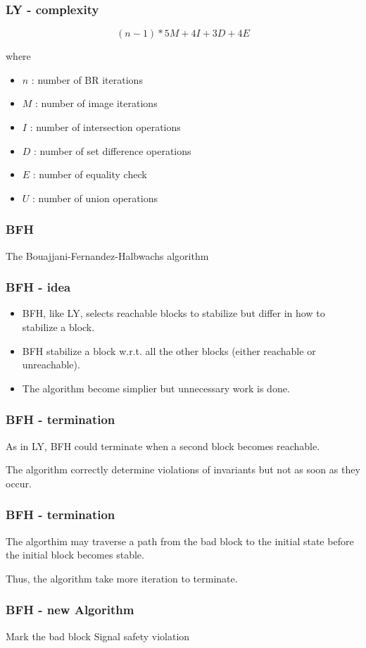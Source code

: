 \documentclass[11pt,handout]{beamer}
\begin{document}
\begin{frame}
  \frametitle{LY - complexity}
  \[
    (n-1) * 5M + 4I + 3D + 4E
  \]

  where

  \begin{itemize}
  \item $n$ : number of BR iterations
  \item $M$ : number of image iterations
  \item $I$ : number of intersection operations
  \item $D$ : number of set difference operations
  \item $E$ : number of equality check
  \item $U$ : number of union operations
  \end{itemize}
\end{frame}

\begin{frame}
  \frametitle{BFH}
  The Bouajjani-Fernandez-Halbwachs algorithm
\end{frame}

\begin{frame}
  \frametitle{BFH - idea}
  \begin{itemize}
  \item BFH, like LY, selects reachable blocks to stabilize but differ in how to
    stabilize a block.
  \item BFH stabilize a block w.r.t. all the other blocks (either reachable or
    unreachable).
  \item The algorithm become simplier but unnecessary work is done.
  \end{itemize} 
\end{frame}

\begin{frame}
  \frametitle{BFH - termination}
  As in LY, BFH could terminate when a second block becomes reachable.
  
  The algorithm correctly determine violations of invariants but not as soon as
  they occur.
\end{frame}

\begin{frame}
  \frametitle{BFH - termination}
  The algorthim may traverse a path from the bad block to the initial state
  before the initial block becomes stable.

  Thus, the algorithm take more iteration to terminate.
\end{frame}

\begin{frame}[fragile]
  \frametitle{BFH - new Algorithm}
  \begin{algorithmic}[1]
    \State Mark the bad block
    \Else
    \EndIf
    \EndWhile
    \State Signal safety violation
    \EndIf
  \end{algorithmic}
\end{frame}
\end{document}
